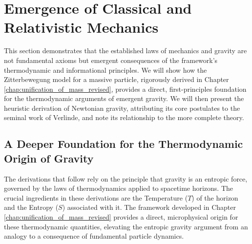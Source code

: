 \documentclass[11pt, letterpaper]{report}
\theoremstyle{plain} %
\theoremstyle{definition} %
\theoremstyle{remark} %
\begin{document}
\section{Emergence of Classical and Relativistic Mechanics}
\label{sec:verify_mechanics}

This section demonstrates that the established laws of mechanics and gravity are not fundamental axioms but emergent consequences of the framework’s thermodynamic and informational principles. We will show how the Zitterbewegung model for a massive particle, rigorously derived in Chapter \ref{chap:unification_of_mass_revised}, provides a direct, first-principles foundation for the thermodynamic arguments of emergent gravity. We will then present the heuristic derivation of Newtonian gravity, attributing its core postulates to the seminal work of Verlinde, and note its relationship to the more complete theory.

\subsection{A Deeper Foundation for the Thermodynamic Origin of Gravity}
\label{subsec:zbw_foundation_for_gravity}

The derivations that follow rely on the principle that gravity is an entropic force, governed by the laws of thermodynamics applied to spacetime horizons. The crucial ingredients in these derivations are the Temperature ($T$) of the horizon and the Entropy ($S$) associated with it. The framework developed in Chapter \ref{chap:unification_of_mass_revised} provides a direct, microphysical origin for these thermodynamic quantities, elevating the entropic gravity argument from an analogy to a consequence of fundamental particle dynamics.
\end{document}
